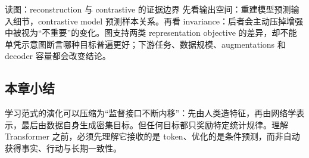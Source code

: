 

\begin{knowledgebox}{读图：reconstruction 与 contrastive 的证据边界}
先看输出空间：重建模型预测输入细节，contrastive model 预测样本关系。再看 invariance：后者会主动压掉增强中被视为“不重要”的变化。图支持两类 representation objective 的差异，却不能单凭示意图断言哪种目标普遍更好；下游任务、数据规模、augmentations 和 decoder 容量都会改变结论。
\end{knowledgebox}

\subsection{本章小结}

学习范式的演化可以压缩为“监督接口不断内移”：先由人类造特征，再由网络学表示，最后由数据自身生成密集目标。但任何目标都只奖励特定统计规律。理解 Transformer 之前，必须先理解它接收的是 token、优化的是条件预测，而非自动获得事实、行动与长期一致性。

